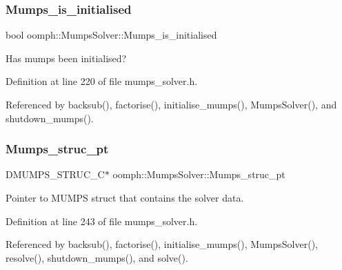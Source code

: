 \mbox{\label{classoomph_1_1MumpsSolver_a3512c04b1bfcf11064c0da453ba34806}} 
\subsubsection{\texorpdfstring{Mumps\+\_\+is\+\_\+initialised}{Mumps\_is\_initialised}}
{\footnotesize\ttfamily bool oomph\+::\+Mumps\+Solver\+::\+Mumps\+\_\+is\+\_\+initialised\hspace{0.3cm}{\ttfamily [private]}}



Has mumps been initialised? 



Definition at line 220 of file mumps\+\_\+solver.\+h.



Referenced by backsub(), factorise(), initialise\+\_\+mumps(), Mumps\+Solver(), and shutdown\+\_\+mumps().

\mbox{\label{classoomph_1_1MumpsSolver_a0cf148106cf3cc86e238ae4f289be0f8}} 
\subsubsection{\texorpdfstring{Mumps\+\_\+struc\+\_\+pt}{Mumps\_struc\_pt}}
{\footnotesize\ttfamily D\+M\+U\+M\+P\+S\+\_\+\+S\+T\+R\+U\+C\+\_\+C$\ast$ oomph\+::\+Mumps\+Solver\+::\+Mumps\+\_\+struc\+\_\+pt\hspace{0.3cm}{\ttfamily [private]}}



Pointer to M\+U\+M\+PS struct that contains the solver data. 



Definition at line 243 of file mumps\+\_\+solver.\+h.



Referenced by backsub(), factorise(), initialise\+\_\+mumps(), Mumps\+Solver(), resolve(), shutdown\+\_\+mumps(), and solve().

